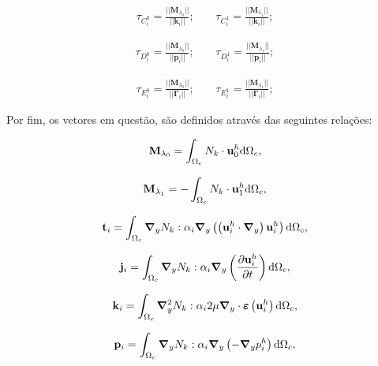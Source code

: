\begin{align}
	\tau_{C_i^{0}} = \frac{|| \mathbf{M}_{\lambda_0} || }{||\mathbf{k}_{i} ||}; \ \ \ \ \  & \tau_{C_i^{1}} = \frac{|| \mathbf{M}_{\lambda_1} || }{||\mathbf{k}_{i} ||};
\end{align}

\begin{align}
	\tau_{D_i^{0}} = \frac{|| \mathbf{M}_{\lambda_0} || }{||\mathbf{p}_{i} ||}; \ \ \ \ \  & \tau_{D_i^{1}} = \frac{|| \mathbf{M}_{\lambda_1} || }{||\mathbf{p}_{i} ||}; 
\end{align}

\begin{align}
	\tau_{E_i^{0}} = \frac{|| \mathbf{M}_{\lambda_0} || }{||\mathbf{\Gamma}_{i} ||}; \ \ \ \ \  & \tau_{E_i^{1}} = \frac{|| \mathbf{M}_{\lambda_1} || }{||\mathbf{\Gamma}_{i} ||};
\end{align}

Por fim, os vetores em questão, são definidos através das seguintes relações:

\begin{align}
	\mathbf{M}_{\lambda_0} = \int_{\Omega_c} N_{k} \cdot \mathbf{u}_0^h \mathrm{d} \Omega_c,
\end{align}

\begin{align}
	\mathbf{M}_{\lambda_1} = - \int_{\Omega_c} N_{k} \cdot \mathbf{u}_1^h \mathrm{d} \Omega_c,
\end{align}

\begin{align}
	\mathbf{t}_{i} = \int_{\Omega_c} \boldsymbol{\nabla}_y N_{k} : \alpha_i \boldsymbol{\nabla}_y \left( \left( \mathbf{u}_i^{h} \cdot  \boldsymbol{\nabla}_y \right) \mathbf{u}_i^{h} \right)  \mathrm{d} \Omega_c,
\end{align}

\begin{align}
	\mathbf{j}_{i} = \int_{\Omega_c} \boldsymbol{\nabla}_y N_{k} :  \alpha_i \boldsymbol{\nabla}_y \left(\frac{\partial\mathbf{u}_i^{h}}{\partial t}  \right)  \mathrm{d} \Omega_c,
\end{align}

\begin{align}
	\mathbf{k}_{i} = \int_{\Omega_c} \boldsymbol{\nabla}_y^{2} N_{k} : \alpha_i 2 \mu \boldsymbol{\nabla}_y \cdot \bm{\varepsilon} \left(\mathbf{u}_i^{h}\right)    \mathrm{d} \Omega_c,
\end{align}

\begin{align}
	\mathbf{p}_{i} = \int_{\Omega_c} \boldsymbol{\nabla}_y N_{k} : \alpha_i \boldsymbol{\nabla}_y \left(-\boldsymbol{\nabla}_y p_i^{h} \right)    \mathrm{d} \Omega_c,
\end{align}

